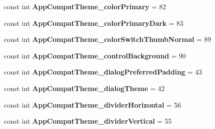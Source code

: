 \begin{DoxyCompactItemize}
\item 
\mbox{\label{class_pinned_app_1_1_droid_1_1_resource_1_1_styleable_a422b0dfdf301259e9beada2fcfcb16bc}} 
const int {\bfseries App\+Compat\+Theme\+\_\+color\+Primary} = 82
\item 
\mbox{\label{class_pinned_app_1_1_droid_1_1_resource_1_1_styleable_a51f280459e71ffb959b3af6666b6361a}} 
const int {\bfseries App\+Compat\+Theme\+\_\+color\+Primary\+Dark} = 83
\item 
\mbox{\label{class_pinned_app_1_1_droid_1_1_resource_1_1_styleable_a61e31888de22cac4a1afa403ef161b60}} 
const int {\bfseries App\+Compat\+Theme\+\_\+color\+Switch\+Thumb\+Normal} = 89
\item 
\mbox{\label{class_pinned_app_1_1_droid_1_1_resource_1_1_styleable_aa18b63cbf966d3af210f55cd882b9205}} 
const int {\bfseries App\+Compat\+Theme\+\_\+control\+Background} = 90
\item 
\mbox{\label{class_pinned_app_1_1_droid_1_1_resource_1_1_styleable_a52cf1da47c68bd1b3a7907b8cd7cb321}} 
const int {\bfseries App\+Compat\+Theme\+\_\+dialog\+Preferred\+Padding} = 43
\item 
\mbox{\label{class_pinned_app_1_1_droid_1_1_resource_1_1_styleable_a9028aabcc76c8128ff95c711680c8a1e}} 
const int {\bfseries App\+Compat\+Theme\+\_\+dialog\+Theme} = 42
\item 
\mbox{\label{class_pinned_app_1_1_droid_1_1_resource_1_1_styleable_af7473a4ae31872710c62cc34b8d60267}} 
const int {\bfseries App\+Compat\+Theme\+\_\+divider\+Horizontal} = 56
\item 
\mbox{\label{class_pinned_app_1_1_droid_1_1_resource_1_1_styleable_a4186feec9307a4a98dce2e4c3ad0376f}} 
const int {\bfseries App\+Compat\+Theme\+\_\+divider\+Vertical} = 55
\item 

\end{DoxyCompactItemize}
